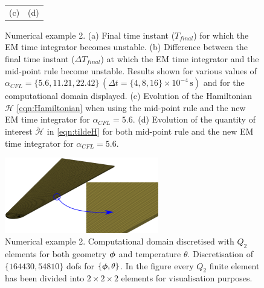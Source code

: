 \begin{figure}[hbtp]
\begin{tabular}{cc}
		{{(c)}}& 		{{(d)}}
	\end{tabular}
	\caption{Numerical example 2. (a) Final time instant ($T_{final}$) for which the EM time integrator becomes unstable. (b) Difference between the final time instant ($\Delta T_{final}$) at which the EM time integrator and the mid-point rule become unstable. Results shown for various values of $\alpha_{CFL}=\{5.6,11.21,22.42\}\,(\Delta t=\{4,8,16\}\times 10^{-4}\,\text{s})$ and for the computational domain displayed. (c) Evolution of the Hamiltonian $\mathcal{H}$ \eqref{eqn:Hamiltonian} when using the mid-point rule and the new EM time integrator for $\alpha_{CFL}=5.6$. (d) Evolution of the quantity of interest $\widetilde{\mathcal{H}}$ in \eqref{eqn:tildeH} for both mid-point rule and the new EM time integrator for $\alpha_{CFL}=5.6$.}
	\label{fig:example 3 Stability analysis}
\end{figure}


\begin{figure}[hbtp]
	\centering
	\includegraphics[width=0.6\textwidth]{Figures/Example3/MeshAndDetail.eps}
	\caption{Numerical example 2. Computational domain discretised with $Q_2$ elements for both geometry $\boldsymbol{\phi}$ and temperature $\theta$. Discretisation of $\{164430,54810\}$ dofs for $\{\boldsymbol{\phi},\theta\}$. In the figure every $Q_2$ finite element has been divided into $2\times 2\times 2$ elements for visualisation purposes.}
	\label{fig:example 3 Mesh}
\end{figure}


